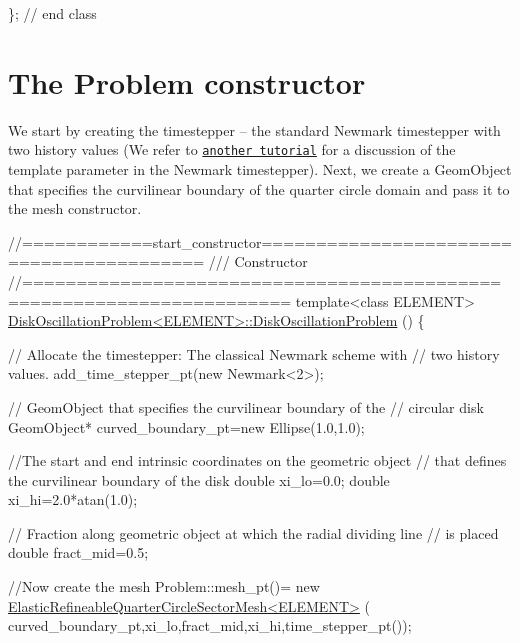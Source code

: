 \begin{DoxyCodeInclude}
\}; \textcolor{comment}{// end class}

\end{DoxyCodeInclude}




 

\hypertarget{index_start_constructor}{}\section{The Problem constructor}\label{index_start_constructor}
We start by creating the timestepper -- the standard {\ttfamily Newmark} timestepper with two history values (We refer to \href{../../../beam/unsteady_ring/html/index.html#prev}{\tt another tutorial} for a discussion of the template parameter in the {\ttfamily Newmark} timestepper). Next, we create a {\ttfamily Geom\+Object} that specifies the curvilinear boundary of the quarter circle domain and pass it to the mesh constructor.

 
\begin{DoxyCodeInclude}
\textcolor{comment}{//============start\_constructor========================================= }
\textcolor{comment}{/// Constructor}
\textcolor{comment}{}\textcolor{comment}{//====================================================================== }
\textcolor{keyword}{template}<\textcolor{keyword}{class} ELEMENT>
\hyperlink{classDiskOscillationProblem_a5ce89d95d655d8c5b579171c8e9a54b9}{DiskOscillationProblem<ELEMENT>::DiskOscillationProblem}
      () 
\{

 \textcolor{comment}{// Allocate the timestepper: The classical Newmark scheme with}
 \textcolor{comment}{// two history values.}
 add\_time\_stepper\_pt(\textcolor{keyword}{new} Newmark<2>);
 
 

 \textcolor{comment}{// GeomObject that specifies the curvilinear boundary of the}
 \textcolor{comment}{// circular disk}
 GeomObject* curved\_boundary\_pt=\textcolor{keyword}{new} Ellipse(1.0,1.0);

 \textcolor{comment}{//The start and end intrinsic coordinates on the geometric object}
 \textcolor{comment}{// that defines the curvilinear boundary of the disk}
 \textcolor{keywordtype}{double} xi\_lo=0.0;
 \textcolor{keywordtype}{double} xi\_hi=2.0*atan(1.0);

 \textcolor{comment}{// Fraction along geometric object at which the radial dividing line}
 \textcolor{comment}{// is placed}
 \textcolor{keywordtype}{double} fract\_mid=0.5;

 \textcolor{comment}{//Now create the mesh}
 Problem::mesh\_pt()= \textcolor{keyword}{new} \hyperlink{classElasticRefineableQuarterCircleSectorMesh}{ElasticRefineableQuarterCircleSectorMesh<ELEMENT>}
      (
  curved\_boundary\_pt,xi\_lo,fract\_mid,xi\_hi,time\_stepper\_pt());

\end{DoxyCodeInclude}


